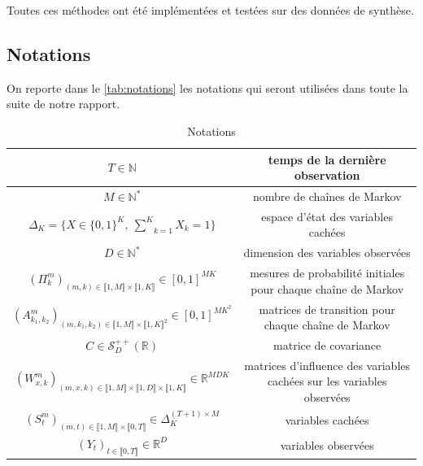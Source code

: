 \documentclass[10pt,a4paper]{article}
\begin{document}
Toutes ces méthodes ont été implémentées et testées sur des données de synthèse.

\subsection{Notations}

On reporte dans le \autoref{tab:notations} les notations qui seront utilisées
dans toute la suite de notre rapport.

\begin{table}[hpbt]

\begin{center}
  \begin{tabular}{|c|c|}
  \hline
  $T \in \mathbb{N}$ & temps de la dernière observation \\ \hline
  $M \in \mathbb{N}^*$ & nombre de chaînes de Markov \\ \hline
  $\Delta_K=\lbrace X \in \lbrace0,1\rbrace^K, \ 
  \underset{k=1}{\overset{K}{\sum}}X_k=1\rbrace$ & espace d'état des variables 
  cachées \\ \hline
  $D \in \mathbb{N}^*$ & dimension des variables observées \\ \hline
  $(\Pi_{k}^m)_{(m,k) \in \llbracket 1,M \rrbracket \times \llbracket 1,K 
  \rrbracket} \in [0,1]^{MK}$ & mesures de probabilité initiales pour chaque 
  chaîne de Markov \\ \hline
  $(A_{k_1,k_2}^m)_{(m,k_1,k_2) \in \llbracket 1,M \rrbracket \times \llbracket 
  1,K \rrbracket^2} \in [0,1]^{MK^2}$ & matrices de transition pour chaque chaîne 
  de Markov \\ \hline
  $C \in \mathcal{S}_D^{++}(\mathbb{R})$ & matrice de covariance \\ \hline
  $(W_{x,k}^m)_{(m,x,k) \in \llbracket 1,M \rrbracket \times \llbracket 1,D 
  \rrbracket \times \llbracket 1,K \rrbracket} \in \mathbb{R}^{MDK}$ & matrices 
  d'influence des variables cachées sur les variables observées \\ \hline
  $(S_t^m)_{(m,t) \in \llbracket 1,M \rrbracket \times \llbracket 0,T \rrbracket 
  } \in \Delta_K^{(T+1)\times M}$ & variables cachées \\ \hline
  $(Y_t)_{t \in \llbracket 0,T \rrbracket} \in \mathbb{R}^D$ & variables 
  observées \\ \hline
  \end{tabular}
  \caption{Notations\label{tab:notations}}
\end{center}
\end{table}
\end{document}
